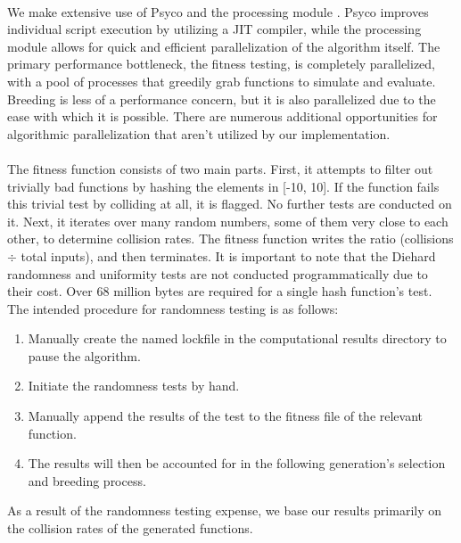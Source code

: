 \documentclass{article}
\begin{document}
\paragraph{}
We make extensive use of Psyco \cite{Psyco} and the processing module \cite{Processing}. Psyco improves individual script execution by utilizing a JIT compiler, while the processing module allows for quick and efficient parallelization of the algorithm itself.
The primary performance bottleneck, the fitness testing, is completely parallelized, with a pool of processes that greedily grab functions to simulate and evaluate. Breeding is less of a performance concern, but it is also parallelized due to the ease with which it is possible. There are numerous additional opportunities for algorithmic parallelization that aren't utilized by our implementation.

\paragraph{}
The fitness function consists of two main parts. First, it attempts to filter out trivially bad functions by hashing the elements in [-10, 10]. If the function fails this trivial test by colliding at all, it is flagged. No further tests are conducted on it.
Next, it iterates over many random numbers, some of them very close to each other, to determine collision rates.
The fitness function writes the ratio (collisions $\div$ total inputs), and then terminates.
It is important to note that the Diehard \cite{Diehard} randomness and uniformity tests are not conducted programmatically due to their cost. Over 68 million bytes are required for a single hash function's test. The intended procedure for randomness testing is as follows:
\begin{enumerate}
	\item Manually create the named lockfile in the computational results directory to pause the algorithm.
	\item Initiate the randomness tests by hand.
	\item Manually append the results of the test to the fitness file of the relevant function. 
	\item The results will then be accounted for in the following generation's selection and breeding process.
\end{enumerate}

As a result of the randomness testing expense, we base our results primarily on the collision rates of the generated functions.
\end{document}
